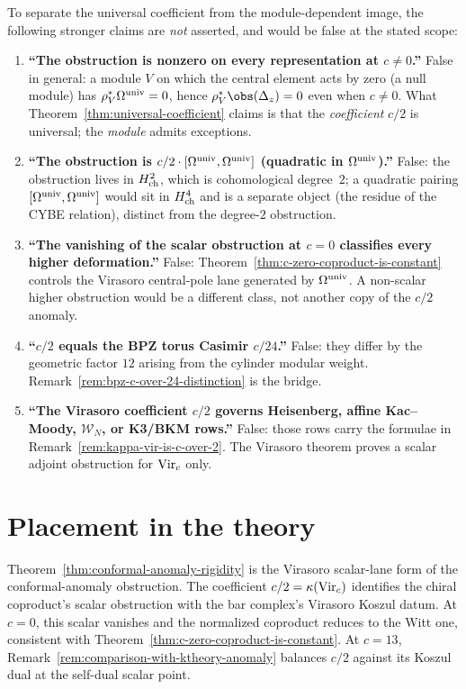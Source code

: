To separate the universal coefficient from the module-dependent image,
the following stronger claims are
\emph{not} asserted, and would be false at the stated scope:

\begin{enumerate}[label=\textup{(\arabic*)}]
\item \textbf{``The obstruction is nonzero on every representation at $c \neq 0$.''}
 False in general: a module $V$ on which the central element acts by
 zero (a null module) has $\rho_{V}^{*}\Omega^{\mathrm{univ}} = 0$, hence
 $\rho_{V}^{*}\obs(\Delta_{z}) = 0$ even when $c \neq 0$. What
 Theorem~\ref{thm:universal-coefficient} claims is that the
 \emph{coefficient} $c/2$ is universal; the \emph{module} admits
 exceptions.
\item \textbf{``The obstruction is $c/2 \cdot [\Omega^{\mathrm{univ}}, \Omega^{\mathrm{univ}}]$ (quadratic in $\Omega^{\mathrm{univ}}$).''}
 False: the obstruction lives in $H^{2}_{\mathrm{ch}}$, which is cohomological
 degree~$2$; a quadratic pairing $[\Omega^{\mathrm{univ}}, \Omega^{\mathrm{univ}}]$ would sit in
 $H^{4}_{\mathrm{ch}}$ and is a separate object (the residue of the CYBE
 relation), distinct from the degree-$2$ obstruction.
\item \textbf{``The vanishing of the scalar obstruction at $c = 0$ classifies every higher deformation.''}
 False: Theorem~\ref{thm:c-zero-coproduct-is-constant} controls the
 Virasoro central-pole lane generated by $\Omega^{\mathrm{univ}}$. A non-scalar higher
 obstruction would be a different class, not another copy of the
 $c/2$ anomaly.
\item \textbf{``$c/2$ equals the BPZ torus Casimir $c/24$.''}
 False: they differ by the geometric factor $12$ arising from the
 cylinder modular weight. Remark~\ref{rem:bpz-c-over-24-distinction}
 is the bridge.
\item \textbf{``The Virasoro coefficient $c/2$ governs Heisenberg, affine Kac--Moody, $\mathcal W_N$, or K3/BKM rows.''}
 False: those rows carry the formulae in
 Remark~\ref{rem:kappa-vir-is-c-over-2}. The Virasoro theorem proves
 a scalar adjoint obstruction for $\mathrm{Vir}_{c}$ only.
\end{enumerate}

\section{Placement in the theory}
\label{sec:placement-conformal-anomaly}

Theorem~\ref{thm:conformal-anomaly-rigidity} is the Virasoro
scalar-lane form of the conformal-anomaly obstruction. The coefficient
$c/2 = \kappa(\mathrm{Vir}_{c})$ identifies the chiral coproduct's scalar
obstruction with the bar complex's Virasoro Koszul datum. At $c = 0$,
this scalar vanishes and the normalized coproduct reduces to the Witt
one, consistent with Theorem~\ref{thm:c-zero-coproduct-is-constant}.
At $c = 13$, Remark~\ref{rem:comparison-with-ktheory-anomaly} balances
$c/2$ against its Koszul dual at the self-dual scalar point.


